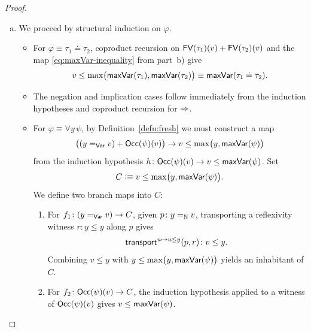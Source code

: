 \begin{proof}
\begin{enumerate}[a),font=\upshape]
\begin{itemize}
            \item The case $\tau_1\cdot\tau_2$ is identical to the sum.
        \end{itemize}

        Now assume $\fun{maxVar}(\tau)\le b$ and $\fun{FV}(\tau)(z)$. The map \eqref{eq:maxVar-inequality} produces a witness of $z\le\fun{maxVar}(\tau)$. Hence, $z\le b$. Combining $b<z$ with $z\le b$ yields $b<b$, which is uninhabited.

        \item We proceed by structural induction on $\varphi$.
        \begin{itemize}
            \item For $\varphi\equiv\tau_1\doteq\tau_2$, coproduct recursion on $\mathsf{FV}(\tau_1)(v)+\mathsf{FV}(\tau_2)(v)$ and the map \eqref{eq:maxVar-inequality} from part~b) give
            \[
                v\le\max\bigl(
                    \mathsf{maxVar}(\tau_1),\mathsf{maxVar}(\tau_2)
                \bigr)
                \equiv
                \mathsf{maxVar}(\tau_1\doteq\tau_2).
            \]

            \item The negation and implication cases follow immediately from the induction hypotheses and coproduct recursion for $\mathrel{\Rightarrow}$.

            \item For $\varphi\equiv\forall y\,\psi$, by Definition~\ref{defn:fresh} we must construct a map
            \[
            \bigl(
                (y\mathrel{=_{\mathsf{Var}}}v)+\mathsf{Occ}(\psi)(v)
                \bigr)
                \to
                v\le\max\bigl(y,\mathsf{maxVar}(\psi)\bigr)
            \]
            from the induction hypothesis $h\colon\fun{Occ}(\psi)(v)\to v\le\fun{maxVar}(\psi)$. Set
            \[
                C\mathrel{\vcentcolon}\equiv v\le\max\bigl(
                    y,\mathsf{maxVar}(\psi)
                \bigr).
            \]
            We define two branch maps into $C$:
            \begin{enumerate}[-]
                \item For $f_1\colon(y\eq{\fun{Var}}v)\to C$, given $p\colon y\eq\N v$, transporting a reflexivity witness $r\colon y\le y$ along $p$ gives
                \[
                    \fun{transport}^{u\mapsto u\le y}(p,r)
                        \colon v\le y.
                \]
                Combining $v\le y$ with $y\le\max\bigl(y,\mathsf{maxVar}(\psi)\bigr)$ yields an inhabitant of $C$.
                
                \item For $f_2\colon\fun{Occ}(\psi)(v)\to C$, the induction hypothesis applied to a witness of $\mathsf{Occ}(\psi)(v)$ gives $v\le\mathsf{maxVar}(\psi)$. 
                

\end{enumerate}
\end{itemize}
\end{enumerate}
\end{proof}
